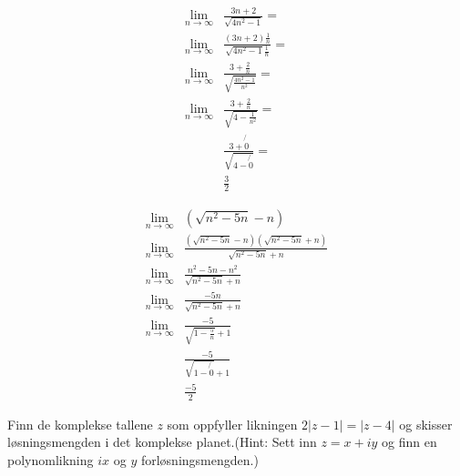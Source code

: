 \documentclass{myassignment}
\begin{document}
	\begin{multicols}{2}
		\begin{answer}
			\begin{align*}
				\lim_{n \rightarrow \infty} &\frac{3n + 2}{\sqrt{4n^2 - 1}} = \\[1em]
				\lim_{n \rightarrow \infty} &\frac{(3n + 2)\frac{1}{n}}{\sqrt{4n^2 -1}\frac{1}{n}} = \\[1em]
				\lim_{n \rightarrow \infty} &\frac{3 + \frac{2}{n}}{\sqrt{\frac{4n^2 -1}{n^2}}} = \\[1em]
				\lim_{n \rightarrow \infty} &\frac{3 + \frac{2}{n}}{\sqrt{4 - \frac{1}{n^2}}} = \\[1em]
				&\frac{3 + \not{0}}{\sqrt{4 -\not{0}}} = \\[1em]
				&\frac{3}{2}
			\end{align*}
		\end{answer}

		\columnbreak
		\begin{answer}
			\begin{align*}
				\lim_{n\rightarrow\infty}&(\sqrt{n^2 - 5n} - n)\\[1em]
				\lim_{n\rightarrow\infty}&\frac{(\sqrt{n^2 - 5n} - n)(\sqrt{n^2 - 5n} + n)}{\sqrt{n^2 - 5n}+n }\\[1em]
				\lim_{n\rightarrow\infty}&\frac{n^2 - 5n - n^2}{\sqrt{n^2 - 5n}+n }\\[1em]
				\lim_{n\rightarrow\infty}&\frac{-5n}{\sqrt{n^2 - 5n}+n }\\[1em]
				\lim_{n\rightarrow\infty}&\frac{-5}{\sqrt{1 - \frac{5}{n}}+1 }\\[1em]
				&\frac{-5}{\sqrt{1 - \not{0}}+1 }\\[1em]
				&\frac{-5}{2}
			\end{align*}
		\end{answer}

	\end{multicols}

	\newpage
	\begin{problem}
		Finn de komplekse tallene $z$ som oppfyller likningen $2|z - 1|=|z - 4|$ og skisser løsningsmengden i det komplekse planet.(Hint: Sett inn $z = x + iy$ og finn en polynomlikning $ix$ og $y$ forløsningsmengden.)
	\end{problem}
\end{document}
